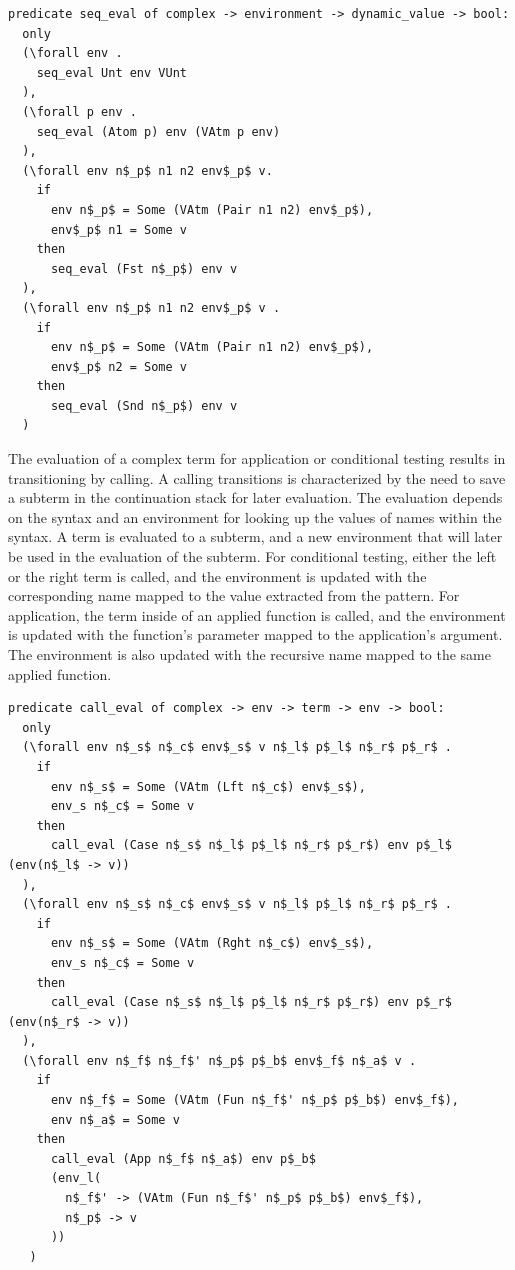 \documentclass[10pt]{article}
\begin{document}
\begin{lstlisting}[language=logic, mathescape]
  predicate seq_eval of complex -> environment -> dynamic_value -> bool:
  only
  (\forall env . 
    seq_eval Unt env VUnt
  ),
  (\forall p env .
    seq_eval (Atom p) env (VAtm p env)
  ),
  (\forall env n$_p$ n1 n2 env$_p$ v. 
    if
      env n$_p$ = Some (VAtm (Pair n1 n2) env$_p$),
      env$_p$ n1 = Some v
    then
      seq_eval (Fst n$_p$) env v
  ),
  (\forall env n$_p$ n1 n2 env$_p$ v . 
    if
      env n$_p$ = Some (VAtm (Pair n1 n2) env$_p$), 
      env$_p$ n2 = Some v 
    then
      seq_eval (Snd n$_p$) env v
  )
  \end{lstlisting}

The evaluation of a complex term for application or conditional testing
results in transitioning by calling. A calling transitions is characterized
by the need to save a subterm in the continuation stack for later evaluation.
The evaluation depends on the syntax
and an environment for looking up the values of names within the syntax.
A term is evaluated to a subterm, and a new environment that will
later be used in the evaluation of the subterm. For conditional testing, either the left or the right
term is called, and the environment is updated with the corresponding name mapped to the
value extracted from the pattern. For application, the term inside of an applied function 
is called, and the environment is updated with the function's parameter mapped to the
application's argument. The environment is also updated with the recursive name mapped to the
same applied function.

\begin{lstlisting}[language=logic, mathescape]
  predicate call_eval of complex -> env -> term -> env -> bool:
  only
  (\forall env n$_s$ n$_c$ env$_s$ v n$_l$ p$_l$ n$_r$ p$_r$ .
    if
      env n$_s$ = Some (VAtm (Lft n$_c$) env$_s$),
      env_s n$_c$ = Some v
    then
      call_eval (Case n$_s$ n$_l$ p$_l$ n$_r$ p$_r$) env p$_l$ (env(n$_l$ -> v))
  ),
  (\forall env n$_s$ n$_c$ env$_s$ v n$_l$ p$_l$ n$_r$ p$_r$ .
    if 
      env n$_s$ = Some (VAtm (Rght n$_c$) env$_s$),
      env_s n$_c$ = Some v
    then
      call_eval (Case n$_s$ n$_l$ p$_l$ n$_r$ p$_r$) env p$_r$ (env(n$_r$ -> v))
  ),
  (\forall env n$_f$ n$_f$' n$_p$ p$_b$ env$_f$ n$_a$ v .
    if 
      env n$_f$ = Some (VAtm (Fun n$_f$' n$_p$ p$_b$) env$_f$),
      env n$_a$ = Some v
    then
      call_eval (App n$_f$ n$_a$) env p$_b$
      (env_l(
        n$_f$' -> (VAtm (Fun n$_f$' n$_p$ p$_b$) env$_f$),
        n$_p$ -> v
      ))
   )
  \end{lstlisting}
  
\end{document}
